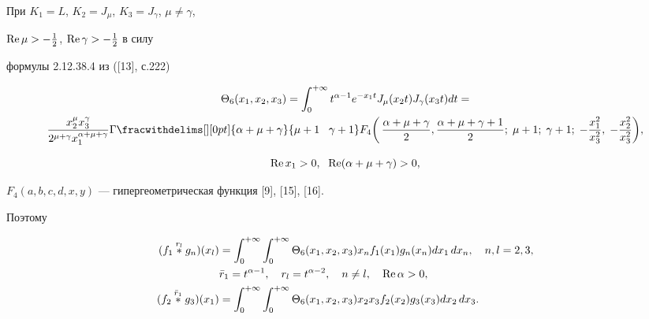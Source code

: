 \begin{exam}


При $K_1=L$, $K_2=J_\mu$, $K_3=J_\gamma$, $\mu\ne\gamma$,


$\operatorname{Re}\mu>-\frac{1}{2}$, $\operatorname{Re}\gamma>-\frac{1}{2}$ в силу


формулы 2.12.38.4 из ([13], с.222)


\begin{multline*}


\Theta_6(x_1,x_2,x_3)=\int^{+\infty}_0 t^{\alpha-1}e^{-x_1t}


J_\mu(x_2t)J_\gamma(x_3t)dt=\\


\frac{x^\mu_2x^\gamma_3}{2^{\mu+\gamma}x_1^{\alpha+\mu+\gamma}}


\Gamma\fracwithdelims[][0pt]{\alpha+\mu+\gamma}{\mu+1\;\;\;\gamma+1}


F_4\biggl(\,\frac{\alpha+\mu+\gamma}{2},


\frac{\alpha+\mu+\gamma+1}{2};\;\mu+1;\;\gamma+1;\;


-\frac{x^2_1}{x^2_3},\;-\frac{x^2_2}{x^2_3}\biggr),


\end{multline*}


$$


\re x_1>0,\ \;\re(\alpha+\mu+\gamma)>0,


$$


$F_4(a,b,c,d,x,y)$ --- гипергеометрическая функция [9], [15], [16].


Поэтому


\begin{align*}


(f_1\up{r_l}{}g_n)(x_l)&=\int^{+\infty}_0 \int^{+\infty}_0


\Theta_6(x_1,x_2,x_3)x_nf_1(x_1)g_n(x_n)dx_1\,dx_n,\quad


n,l=2,3,\\


&\Bar r_1=t^{\alpha-1},\quad r_l=t^{\alpha-2},\quad n\ne l,


\quad \re\alpha>0,\\


(f_2\up{\Bar r_1}{}g_3)(x_1)&=\int^{+\infty}_0 \int^{+\infty}_0


\Theta_6(x_1,x_2,x_3)x_2x_3f_2(x_2)g_3(x_3)dx_2\,dx_3.


\end{align*}


\end{exam}





